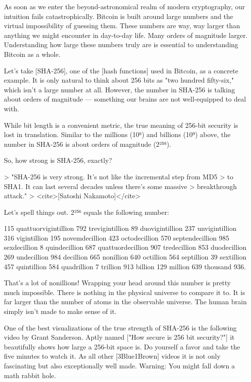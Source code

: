 {%

As soon as we enter the beyond-astronomical realm of modern
cryptography, our intuition fails catastrophically. Bitcoin is built
around large numbers and the virtual impossibility of guessing them.
These numbers are way, way larger than anything we might encounter in
day-to-day life. Many orders of magnitude larger. Understanding how
large these numbers truly are is essential to understanding Bitcoin as a
whole.

Let's take [SHA-256], one of the [hash functions] used in Bitcoin, as a
concrete example. It is only natural to think about 256 bits as "two
hundred fifty-six," which isn't a large number at all. However, the
number in SHA-256 is talking about orders of magnitude --- something our
brains are not well-equipped to deal with.

While bit length is a convenient metric, the true meaning of 256-bit
security is lost in translation. Similar to the millions (10⁶) and
billions (10⁹) above, the number in SHA-256 is about orders of magnitude
(2²⁵⁶).

So, how strong is SHA-256, exactly?

> "SHA-256 is very strong. It's not like the incremental step from MD5
> to SHA1. It can last several decades unless there's some massive
> breakthrough attack."
> <cite>[Satoshi Nakamoto]</cite>

Let's spell things out. 2²⁵⁶ equals the following number:

    115 quattuorvigintillion 792 trevigintillion 89 duovigintillion 237 unvigintillion 316 vigintillion 195 novemdecillion 423 octodecillion 570 septendecillion 985 sexdecillion 8 quindecillion 687 quattuordecillion 907 tredecillion 853 duodecillion 269 undecillion 984 decillion 665 nonillion 640 octillion 564 septillion 39 sextillion 457 quintillion 584 quadrillion 7 trillion 913 billion 129 million 639 thousand 936.

That's a lot of nonillions! Wrapping your head around this number is
pretty much impossible. There is nothing in the physical universe to
compare it to. It is far larger than the number of atoms in the
observable universe. The human brain simply isn't made to make sense of
it.

One of the best visualizations of the true strength of SHA-256 is the
following video by Grant Sanderson. Aptly named ["How secure is 256 bit
security?"] it beautifully shows how large a 256-bit space is. Do
yourself a favor and take the five minutes to watch it. As all other
[3Blue1Brown] videos it is not only fascinating but also exceptionally
well made. Warning: You might fall down a math rabbit hole.

}
